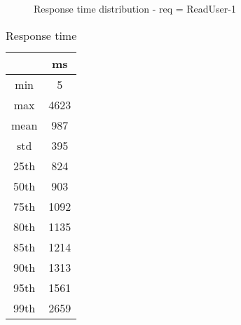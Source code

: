 \begin{minipage}{0.75\linewidth}
\begin{figure}[h]
\begin{adjustbox}{max width=1.0\linewidth, keepaspectratio}
  \end{adjustbox}
  \caption{Response time distribution - req = ReadUser-1}
\end{figure}
\end{minipage}\hfill\begin{minipage}{0.18\linewidth}
\begin{table}[h]
\begin{tabular}{|cc|}
\hline
\textbf{} & \textbf{ms}\\ \hline
 \Xhline{0.005\arrayrulewidth}
min & 5\\
 \Xhline{0.005\arrayrulewidth}
max & 4623\\
 \Xhline{0.005\arrayrulewidth}
mean & 987\\
 \Xhline{0.005\arrayrulewidth}
std & 395\\
\hline
\hline
 \Xhline{0.005\arrayrulewidth}
25th & 824\\
 \Xhline{0.005\arrayrulewidth}
50th & 903\\
 \Xhline{0.005\arrayrulewidth}
75th & 1092\\
 \Xhline{0.005\arrayrulewidth}
80th & 1135\\
 \Xhline{0.005\arrayrulewidth}
85th & 1214\\
 \Xhline{0.005\arrayrulewidth}
90th & 1313\\
 \Xhline{0.005\arrayrulewidth}
95th & 1561\\
 \Xhline{0.005\arrayrulewidth}
99th & 2659\\
\hline
\end{tabular}
\caption{Response time}
\end{table}
\end{minipage}\hfill